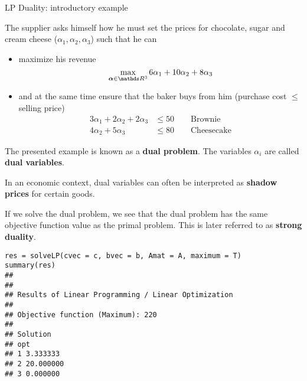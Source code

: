 \documentclass[11pt,compress,t,notes=noshow, xcolor=table]{beamer}
\begin{document}
\begin{vbframe}{LP Duality: introductory example}
\lz

The supplier asks himself how he must set the prices for chocolate, sugar and cream cheese ($\alpha_1, \alpha_2, \alpha_3$) such that he can

\begin{itemize}
\item maximize his revenue
$$
\max_{\bm{\alpha} \in \R^3}6 \alpha_1 + 10 \alpha_2 + 8 \alpha_3
$$
\item and at the same time ensure that the baker buys from him (purchase cost $\le$ selling price)
\begin{align*}
    3\alpha_1 + 2\alpha_2 + 2\alpha_3 &\le 50 \qquad \text{Brownie} \\
    4\alpha_2 + 5\alpha_3 &\le 80 \qquad \text{Cheesecake}
\end{align*}

\end{itemize}

\framebreak

The presented example is known as a \textbf{dual problem}. The variables $\alpha_i$ are called \textbf{dual variables}.

\lz

In an economic context, dual variables can often be interpreted as \textbf{shadow prices} for certain goods.

\lz

If we solve the dual problem, we see that the dual problem has the same objective function value as the primal problem. This is later referred to as \textbf{strong duality}.

%
\framebreak
\footnotesize
\begin{verbatim}
res = solveLP(cvec = c, bvec = b, Amat = A, maximum = T)
summary(res)
##
##
## Results of Linear Programming / Linear Optimization
##
## Objective function (Maximum): 220
##
## Solution
## opt
## 1 3.333333
## 2 20.000000
## 3 0.000000
\end{verbatim}





\end{vbframe}
\end{document}

